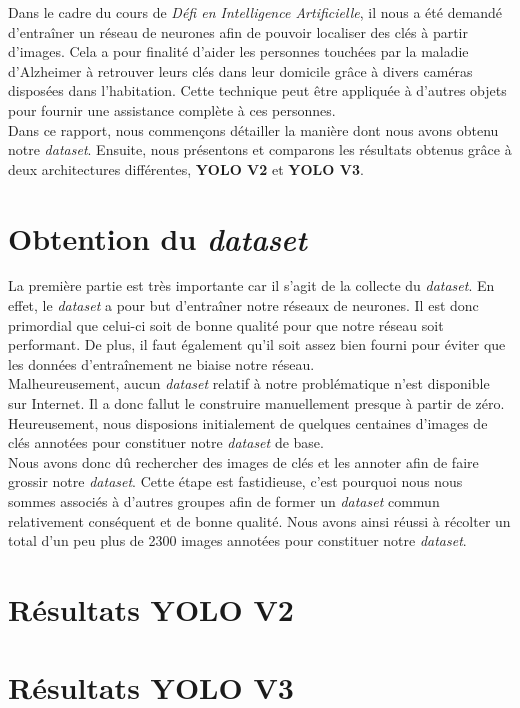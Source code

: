 \documentclass[10pt,a4paper]{article}
\begin{document}
   		Dans le cadre du cours de \textit{Défi en Intelligence Artificielle}, il nous a été demandé d'entraîner un réseau de neurones afin de pouvoir localiser des clés à partir d'images. Cela a pour finalité d'aider les personnes touchées par la maladie d'Alzheimer à retrouver leurs clés dans leur domicile grâce à divers caméras disposées dans l'habitation. Cette technique peut être appliquée à d'autres objets pour fournir une assistance complète à ces personnes.\\
   		
   		Dans ce rapport, nous commençons détailler la manière dont nous avons obtenu notre \textit{dataset}. Ensuite, nous présentons et comparons les résultats obtenus grâce à deux architectures différentes, \textbf{YOLO V2} et \textbf{YOLO V3}.
   	
   	\section{Obtention du \textit{dataset}}
   	
   		La première partie est très importante car il s'agit de la collecte du \textit{dataset}. En effet, le \textit{dataset} a pour but d'entraîner notre réseaux de neurones. Il est donc primordial que celui-ci soit de bonne qualité pour que notre réseau soit performant. De plus, il faut également qu'il soit assez bien fourni pour éviter que les données d'entraînement ne biaise notre réseau.\\
   		
   		Malheureusement, aucun \textit{dataset} relatif à notre problématique n'est disponible sur Internet. Il a donc fallut le construire manuellement presque à partir de zéro. Heureusement, nous disposions initialement de quelques centaines d'images de clés annotées pour constituer notre \textit{dataset} de base.\\
   		
   		Nous avons donc dû rechercher des images de clés et les annoter afin de faire grossir notre \textit{dataset}. Cette étape est fastidieuse, c'est pourquoi nous nous sommes associés à d'autres groupes afin de former un \textit{dataset} commun relativement conséquent et de bonne qualité. Nous avons ainsi réussi à récolter un total d'un peu plus de 2300 images annotées pour constituer notre \textit{dataset}.
   	
   	\section{Résultats \textbf{YOLO V2}}
   	
   	\section{Résultats \textbf{YOLO V3}}
   	
   	\newpage
          	
\end{document}
